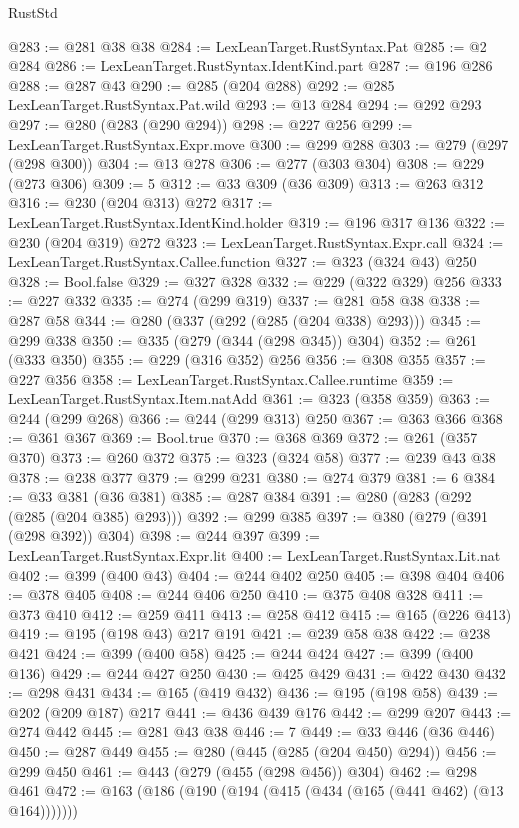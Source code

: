 \begin{lexlean}{RustStd}
\begin{coremodule}
@283 := @281 @38 @38
@284 := LexLeanTarget.RustSyntax.Pat
@285 := @2 @284
@286 := LexLeanTarget.RustSyntax.IdentKind.part
@287 := @196 @286
@288 := @287 @43
@290 := @285 (@204 @288)
@292 := @285 LexLeanTarget.RustSyntax.Pat.wild
@293 := @13 @284
@294 := @292 @293
@297 := @280 (@283 (@290 @294))
@298 := @227 @256
@299 := LexLeanTarget.RustSyntax.Expr.move
@300 := @299 @288
@303 := @279 (@297 (@298 @300))
@304 := @13 @278
@306 := @277 (@303 @304)
@308 := @229 (@273 @306)
@309 := 5
@312 := @33 @309 (@36 @309)
@313 := @263 @312
@316 := @230 (@204 @313) @272
@317 := LexLeanTarget.RustSyntax.IdentKind.holder
@319 := @196 @317 @136
@322 := @230 (@204 @319) @272
@323 := LexLeanTarget.RustSyntax.Expr.call
@324 := LexLeanTarget.RustSyntax.Callee.function
@327 := @323 (@324 @43) @250
@328 := Bool.false
@329 := @327 @328
@332 := @229 (@322 @329) @256
@333 := @227 @332
@335 := @274 (@299 @319)
@337 := @281 @58 @38
@338 := @287 @58
@344 := @280 (@337 (@292 (@285 (@204 @338) @293)))
@345 := @299 @338
@350 := @335 (@279 (@344 (@298 @345)) @304)
@352 := @261 (@333 @350)
@355 := @229 (@316 @352) @256
@356 := @308 @355
@357 := @227 @356
@358 := LexLeanTarget.RustSyntax.Callee.runtime
@359 := LexLeanTarget.RustSyntax.Item.natAdd
@361 := @323 (@358 @359)
@363 := @244 (@299 @268)
@366 := @244 (@299 @313) @250
@367 := @363 @366
@368 := @361 @367
@369 := Bool.true
@370 := @368 @369
@372 := @261 (@357 @370)
@373 := @260 @372
@375 := @323 (@324 @58)
@377 := @239 @43 @38
@378 := @238 @377
@379 := @299 @231
@380 := @274 @379
@381 := 6
@384 := @33 @381 (@36 @381)
@385 := @287 @384
@391 := @280 (@283 (@292 (@285 (@204 @385) @293)))
@392 := @299 @385
@397 := @380 (@279 (@391 (@298 @392)) @304)
@398 := @244 @397
@399 := LexLeanTarget.RustSyntax.Expr.lit
@400 := LexLeanTarget.RustSyntax.Lit.nat
@402 := @399 (@400 @43)
@404 := @244 @402 @250
@405 := @398 @404
@406 := @378 @405
@408 := @244 @406 @250
@410 := @375 @408 @328
@411 := @373 @410
@412 := @259 @411
@413 := @258 @412
@415 := @165 (@226 @413)
@419 := @195 (@198 @43) @217 @191
@421 := @239 @58 @38
@422 := @238 @421
@424 := @399 (@400 @58)
@425 := @244 @424
@427 := @399 (@400 @136)
@429 := @244 @427 @250
@430 := @425 @429
@431 := @422 @430
@432 := @298 @431
@434 := @165 (@419 @432)
@436 := @195 (@198 @58)
@439 := @202 (@209 @187) @217
@441 := @436 @439 @176
@442 := @299 @207
@443 := @274 @442
@445 := @281 @43 @38
@446 := 7
@449 := @33 @446 (@36 @446)
@450 := @287 @449
@455 := @280 (@445 (@285 (@204 @450) @294))
@456 := @299 @450
@461 := @443 (@279 (@455 (@298 @456)) @304)
@462 := @298 @461
@472 := @163 (@186 (@190 (@194 (@415 (@434 (@165 (@441 @462) (@13 @164)))))))

\end{coremodule}
\end{lexlean}
